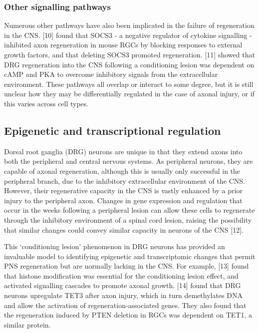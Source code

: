 \documentclass[
  12pt,
  a4paper,
]{book}
\begin{document}
\hypertarget{other-signalling-pathways}{%
\subsubsection{Other signalling pathways}\label{other-signalling-pathways}}

Numerous other pathways have also been implicated in the failure of regeneration in the CNS. {[}10{]} found that SOCS3 - a negative regulator of cytokine signalling - inhibited axon regeneration in mouse RGCs by blocking responses to external growth factors, and that deleting SOCS3 promoted regeneration. {[}11{]} showed that DRG regeneration into the CNS following a conditioning lesion was dependent on cAMP and PKA to overcome inhibitory signals from the extracellular environment. These pathways all overlap or interact to some degree, but it is still unclear how they may be differentially regulated in the case of axonal injury, or if this varies across cell types.

\hypertarget{epigenetic-and-transcriptional-regulation}{%
\subsection{Epigenetic and transcriptional regulation}\label{epigenetic-and-transcriptional-regulation}}

Dorsal root ganglia (DRG) neurons are unique in that they extend axons into both the peripheral and central nervous systems. As peripheral neurons, they are capable of axonal regeneration, although this is usually only successful in the peripheral branch, due to the inhibitory extracellular environment of the CNS. However, their regenerative capacity in the CNS is vastly enhanced by a prior injury to the peripheral axon. Changes in gene expression and regulation that occur in the weeks following a peripheral lesion can allow these cells to regenerate through the inhibitory environment of a spinal cord lesion, raising the possibility that similar changes could convey similar capacity in neurons of the CNS {[}12{]}.

This `conditioning lesion' phenomenon in DRG neurons has provided an invaluable model to identifying epigenetic and transcriptomic changes that permit PNS regeneration but are normally lacking in the CNS. For example, {[}13{]} found that histone modification was essential for the conditioning lesion effect, and activated signalling cascades to promote axonal growth. {[}14{]} found that DRG neurons upregulate TET3 after axon injury, which in turn demethylates DNA and allow the activation of regeneration-associated genes. They also found that the regeneration induced by PTEN deletion in RGCs was dependent on TET1, a similar protein.
\end{document}

